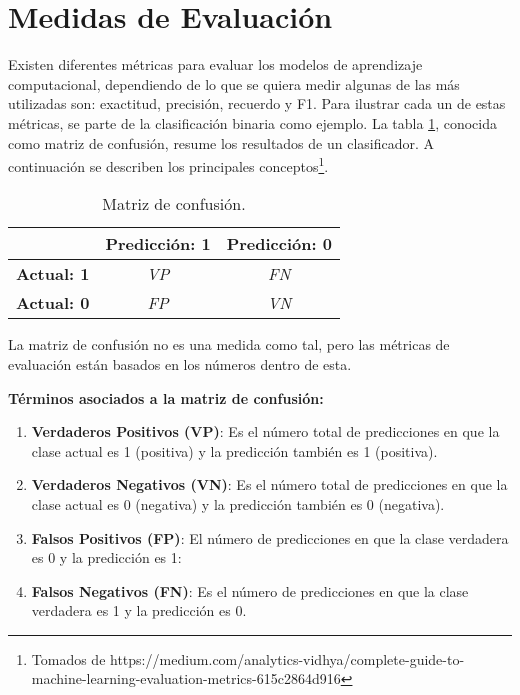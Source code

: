 \section{Medidas de Evaluación}

Existen diferentes métricas para evaluar los modelos de aprendizaje computacional, dependiendo de lo que se quiera medir algunas de las más utilizadas son: exactitud, precisión, recuerdo y F1. Para ilustrar cada un de estas métricas, se parte de la clasificación binaria como ejemplo. La tabla \ref{table:confusion}, conocida como matriz de confusión, resume  los resultados de un clasificador. A continuación se describen los principales conceptos\footnote{Tomados de https://medium.com/analytics-vidhya/complete-guide-to-machine-learning-evaluation-metrics-615c2864d916}.

\begin{table}[ht]
\caption{Matriz de confusión.}
\label{table:confusion} 
\centering 
\begin{small}
\begin{tabular}{l|c|c|}
\cline{2-3}
                                         & \multicolumn{1}{l|}{\textbf{Predicción: 1}} & \multicolumn{1}{l|}{\textbf{Predicción: 0}} \\ \hline
\multicolumn{1}{|l|}{\textbf{Actual: 1}} & \textit{VP}                                 & \textit{FN}                                 \\ \hline
\multicolumn{1}{|l|}{\textbf{Actual: 0}} & \textit{FP}                                 & \textit{VN}                                 \\ \hline
\end{tabular}
\end{small}
\end{table}


La matriz de confusión no es una medida como tal, pero las métricas de evaluación están basados en los números dentro de esta.

\textbf{Términos asociados a la matriz de confusión:}

\begin{enumerate}
    \item \textbf{Verdaderos Positivos (VP)}: Es el número total de predicciones en que la clase actual es 1 (positiva) y la predicción también es 1 (positiva).
    \item \textbf{Verdaderos Negativos (VN)}: Es el número total de predicciones en que la clase actual es 0 (negativa) y la predicción también es 0 (negativa).
    \item \textbf{Falsos Positivos (FP)}: El número de predicciones en que la clase verdadera es 0 y la predicción es 1:
    \item \textbf{Falsos Negativos (FN)}: Es el número de predicciones en que la clase verdadera es 1 y la predicción es 0.
\end{enumerate}

